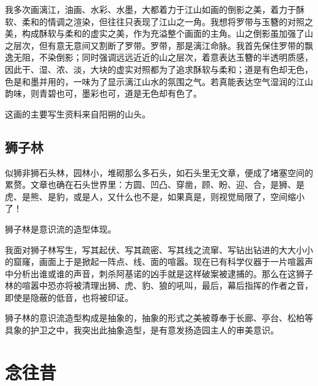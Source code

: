 \documentclass{article}
\begin{document}
我多次画漓江，油画、水彩、水墨，大都着力于江山如画的倒影之美，着力于酥软、柔和的情调之渲染，但往往只表现了江山之一角。我想将罗带与玉簪的对照之美，构成酥软与柔和的虚实之美，作为充溢整个画面的主角。山之倒影虽加强了山之层次，但有意无意间又割断了罗带。罗带，那是漓江命脉。我首先保住罗带的飘逸无阻，不染倒影；同时强调远远近近的山之层次，着意表达玉簪的半透明质感，因此干、湿、浓、淡，大块的虚实对照都为了追求酥软与柔和；道是有色却无色，色是和墨并用的，一味为了显示漓江山水的氛围之气。若真能表达空气湿润的江山韵味，则青碧也可，墨彩也可，道是无色却有色了。

这画的主要写生资料来自阳朔的山头。
\subsection{狮子林}
似狮非狮石头林，园林小，堆砌那么多石头，如石头里无文章，便成了堵塞空间的累赘。文章也确在石头世界里：方圆、凹凸、穿凿，顾、盼、迎、合，是狮、是虎、是熊、是豹，或是人，又什么也不是，如果真是，则视觉局限了，空间缩小了！

狮子林是意识流的造型体现。

我面对狮子林写生，写其起伏、写其疏密、写其线之流窜、写钻出钻进的大大小小的窟窿，画面上于是掀起一阵点、线、面的喧嚣。现在已有科学仪器于一片喧嚣声中分析出谁或谁的声音，刺杀阿基诺的凶手就是这样破案被逮捕的。那么在这狮子林的喧嚣中恐亦将被清理出狮、虎、豹、狼的吼叫，最后，幕后指挥的作者之音，即使是隐蔽的低音，也将被印证。

狮子林的意识流造型构成是抽象的，抽象的形式之美被尊奉于长廊、亭台、松柏等具象的护卫之中，我突出此抽象造型，是有意发扬造园主人的审美意识。
\section{念往昔}
\end{document}
